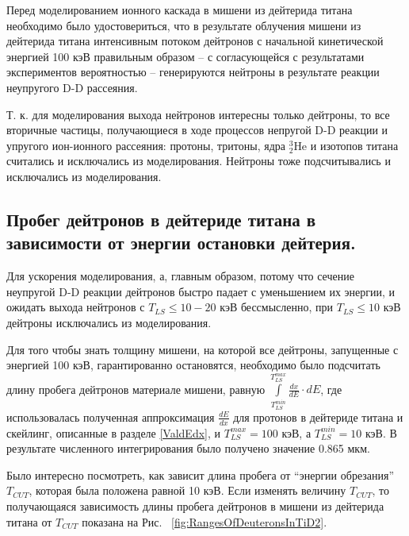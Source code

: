 \documentclass[a4paper,12pt]{article}
\begin{document}
\begin{large}
	Перед моделированием ионного каскада в мишени из дейтерида титана необходимо было удостовериться, что в результате облучения мишени из дейтерида титана интенсивным потоком дейтронов с начальной кинетической энергией 100 кэВ правильным образом -- с согласующейся с результатами экспериментов вероятностью -- генерируются нейтроны в результате реакции неупругого D-D рассеяния.
	
	Т. к. для моделирования выхода нейтронов интересны только дейтроны, то все вторичные частицы, получающиеся в ходе процессов непругой D-D реакции и упругого ион-ионного рассеяния: протоны, тритоны, ядра $^3_2$He и изотопов титана считались и исключались из моделирования.
	Нейтроны тоже подсчитывались и исключались из моделирования.  

\subsection{Пробег дейтронов в дейтериде титана в зависимости от энергии остановки дейтерия.}
\label{DeuteronRangesInTiD2}
	
	Для ускорения моделирования, а, главным образом, потому что сечение неупругой D-D реакции дейтронов быстро падает с уменьшением их энергии, и ожидать выхода нейтронов с $T_{LS} \leq 10-20$ кэВ бессмысленно, при $T_{LS} \leq 10$ кэВ дейтроны исключались из моделирования.
	
	Для того чтобы знать толщину мишени, на которой все дейтроны, запущенные с энергией 100 кэВ, гарантированно остановятся, необходимо было подсчитать длину пробега дейтронов материале мишени, равную $\int \limits^{T^{max}_{LS}}_{T^{min}_{LS}} \frac{dx}{dE} \cdot dE$, где использовалась полученная аппроксимация $\frac{dE}{dx}$ для протонов в дейтериде титана и скейлинг, описанные в разделе \ref{ValdEdx}, и $T^{max}_{LS}=100$ кэВ, а $T^{min}_{LS}=10$ кэВ. В результате численного интегрирования было получено значение 0.865 мкм.
	
	Было интересно посмотреть, как зависит длина пробега от ``энергии обрезания'' $T_{CUT}$, которая была положена равной 10 кэВ.
	Если изменять величину $T_{CUT}$, то получающаяся зависимость длины пробега дейтронов в мишени из дейтерида титана от $T_{CUT}$ показана на Рис. ~\ref{fig:RangesOfDeuteronsInTiD2}.
	  

\end{large}
\end{document}
